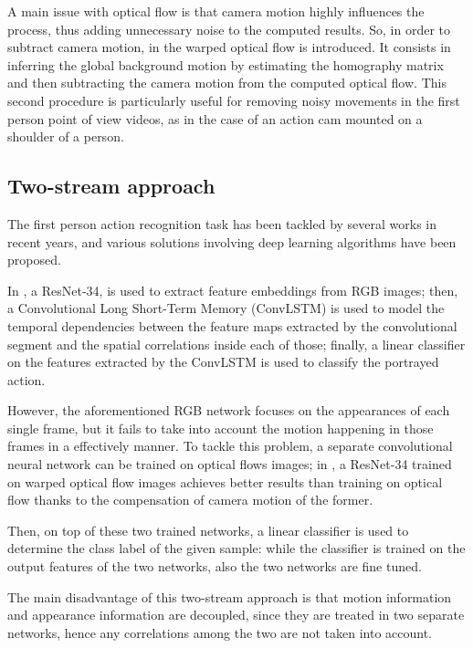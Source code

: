 \documentclass[10pt,twocolumn,letterpaper]{article}
\begin{document}
A main issue with optical flow is that camera motion highly influences the process, thus adding unnecessary noise to the computed results. So, in order to subtract camera motion, in \cite{wang2013trajectiories} the warped optical flow is introduced. It consists in inferring the global background motion by estimating the homography matrix and then subtracting the camera motion from the computed optical flow. This second procedure is particularly useful for removing noisy movements in the first person point of view videos, as in the case of an action cam mounted on a shoulder of a person.

\subsection{Two-stream approach}
\label{par:Ego-RNN}

The first person action recognition task has been tackled by several works in recent years, and various solutions involving deep learning algorithms have been proposed.

In \cite{Ego-RNN}, a ResNet-34, is used to extract feature embeddings from RGB images; then, a Convolutional Long Short-Term Memory (ConvLSTM) is used to model the temporal dependencies between the feature maps extracted by the convolutional segment and the spatial correlations inside each of those; finally, a linear classifier on the features extracted by the ConvLSTM is used to classify the portrayed action.

However, the aforementioned RGB network focuses on the appearances of each single frame, but it fails to take into account the motion happening in those frames in a effectively manner. To tackle this problem, a separate convolutional neural network can be trained on optical flows images; in \cite{Ego-RNN}, a ResNet-34 trained on warped optical flow images achieves better results than training on optical flow thanks to the compensation of camera motion of the former.

Then, on top of these two trained networks, a linear classifier is used to determine the class label of the given sample: while the classifier is trained on the output features of the two networks, also the two networks are fine tuned.

The main disadvantage of this two-stream approach is that motion information and appearance information are decoupled, since they are treated in two separate networks, hence any correlations among the two are not taken into account.
\end{document}
